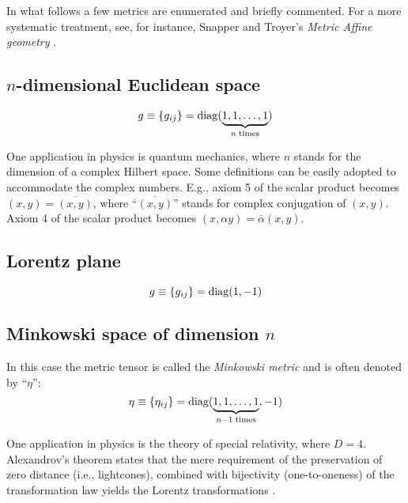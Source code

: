 In what follows a few metrics are enumerated and briefly commented.
For a more systematic treatment, see, for instance, Snapper and Troyer's {\em Metric Affine geometry} \cite{snapper-troyer}.


\subsection*{$n$-dimensional Euclidean space}

\begin{equation}
g\equiv \{g_{ij}\}={\rm diag} (\underbrace{1,1,\ldots ,1}_{n\; {\rm times}})
\end{equation}

One application in physics is quantum mechanics,
where $n$ stands for the dimension of a complex Hilbert space.
Some definitions can be easily adopted to accommodate the complex numbers.
E.g., axiom 5 of the scalar product becomes
$(x,y)=\overline{(x,y)}$, where ``$\overline{(x,y)}$'' stands for complex conjugation of $(x,y)$.
Axiom 4 of the scalar product becomes
$(x,\alpha y)=\overline{\alpha} (x,y)$.

\subsection*{Lorentz plane}


\begin{equation}
g\equiv \{g_{ij}\}={\rm diag} (1,-1)
\end{equation}

\subsection*{Minkowski space of dimension $n$}

In this case the metric tensor is called the
{\em Minkowski metric}
and is often denoted by  ``$\eta$'':
\begin{equation}
\eta \equiv \{\eta_{ij}\}={\rm diag} (\underbrace{1,1,\ldots ,1}_{n-1\; {\rm times}},-1)
\label{2012-m-ch-tensor-minspn}
\end{equation}


One application in physics is the theory of special relativity,
where $D=4$.
Alexandrov's theorem states that the mere requirement of the preservation of
zero distance (i.e., lightcones), combined with bijectivity (one-to-oneness) of the transformation law
yields the Lorentz transformations
\cite{alex1,alex2,alex3,alex-col,borchers-heger,benz,lester,svozil-2001-convention}.



